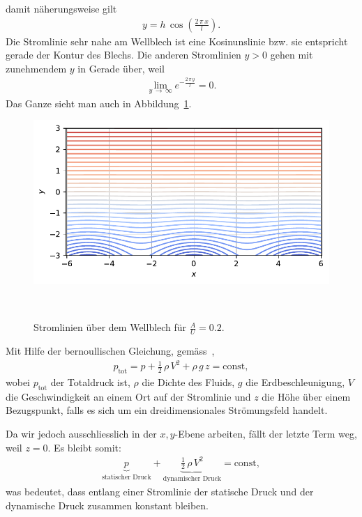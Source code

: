 damit näherungsweise gilt
\begin{align*}
    y
    =
    h\,\cos\left(\frac{2\,\pi\,x}{l}\right).
\end{align*}
Die Stromlinie sehr nahe am Wellblech ist eine
Kosinunslinie bzw. sie entspricht gerade der Kontur
des Blechs.
Die anderen Stromlinien $y > 0$ gehen mit zunehmendem $y$
in Gerade über, weil
\begin{align*}
    \lim_{y\,\to\,\infty}
    e^{-\frac{2\,\pi\,y}{l}}
    =
    0.
\end{align*}
Das Ganze sieht man auch in Abbildung~\ref{fig:stromlinien}.
\begin{figure}
    \centering
    \includegraphics[width=\textwidth]{papers/ueberschall/figures/Stromlinien.pdf}
    \caption{Stromlinien über dem Wellblech für $\frac{A}{U}=0.2$.}
    ~\label{fig:stromlinien}  
\end{figure}

Mit Hilfe der bernoullischen Gleichung, gemäss~\cite{BernoulliWikiDE},
\begin{align*}
    p_{\text{tot}} 
    = 
    p 
    + 
    \frac{1}{2}\,\rho\,V^2 
    + 
    \rho\,g\,z = \text{const},
\end{align*}
wobei $p_{\text{tot}}$ der Totaldruck ist, 
$\rho$ die Dichte des Fluids, $g$ die Erdbeschleunigung,
$V$ die Geschwindigkeit an einem Ort auf der Stromlinie 
und $z$ die Höhe über einem Bezugspunkt,
falls es sich um ein dreidimensionales Strömungsfeld handelt.

Da wir jedoch ausschliesslich in der $x,y$-Ebene arbeiten, 
fällt der letzte Term weg, weil $z = 0$.
Es bleibt somit:
\begin{align*}
    \underbrace{p}_{\text{statischer Druck}} 
    + 
    \underbrace{\frac{1}{2}\,\rho\,V^2}_{\text{dynamischer Druck}} 
    = 
    \text{const},
\end{align*}
was bedeutet, dass entlang einer Stromlinie 
der statische Druck und der dynamische Druck
zusammen konstant bleiben.

